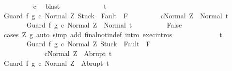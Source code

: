 \begin{isabellebody}
\ \ \ \ \ \ \ \ \isamarkupfalse%
\ c{\isacharprime}{\isacharprime}\ \isamarkupfalse%
\ blast\isanewline
\ \ \ \ \isamarkupfalse%
\isanewline
\ \ \ \ \ \ \isamarkupfalse%
\ t\isanewline
\ \ \ \ \ \ \isamarkupfalse%
\ {\isachardoublequoteopen}{\isasymGamma}{\isasymturnstile}{\isasymlangle}Guard\ f\ g\ c\ {\isacharcomma}Normal\ Z{\isasymrangle}\ {\isasymRightarrow}{\isasymnotin}{\isacharparenleft}{\isacharbraceleft}Stuck{\isacharbraceright}\ {\isasymunion}\ Fault\ {\isacharbackquote}\ {\isacharparenleft}{\isacharminus}F{\isacharparenright}{\isacharparenright}{\isachardoublequoteclose}\ \isanewline
\ \ \ \ \ \ \ \ {\isachardoublequoteopen}{\isasymGamma}{\isasymturnstile}{\isasymlangle}c{\isacharcomma}Normal\ Z{\isasymrangle}\ {\isasymRightarrow}\ Normal\ t{\isachardoublequoteclose}\isanewline
\ \ \ \ \ \ \isamarkupfalse%
\ {\isachardoublequoteopen}{\isasymGamma}{\isasymturnstile}{\isasymlangle}Guard\ f\ g\ c\ {\isacharcomma}Normal\ Z{\isasymrangle}\ {\isasymRightarrow}\ Normal\ t{\isachardoublequoteclose}\isanewline
\ \ \ \ \ \ \ \ \isamarkupfalse%
\ False\isanewline
\ \ \ \ \ \ \ \ \isamarkupfalse%
\ {\isacharparenleft}cases\ {\isachardoublequoteopen}Z{\isasymin}\ g{\isachardoublequoteclose}{\isacharparenright}\ {\isacharparenleft}auto\ simp\ add{\isacharcolon}\ final{\isacharunderscore}notin{\isacharunderscore}def\ intro{\isacharcolon}\ exec{\isachardot}intros\ {\isacharparenright}\isanewline
\ \ \ \ \isamarkupfalse%
\isanewline
\ \ \ \ \ \ \isamarkupfalse%
\ t\isanewline
\ \ \ \ \ \ \isamarkupfalse%
\ {\isachardoublequoteopen}{\isasymGamma}{\isasymturnstile}{\isasymlangle}Guard\ f\ g\ c\ {\isacharcomma}Normal\ Z{\isasymrangle}\ {\isasymRightarrow}{\isasymnotin}{\isacharparenleft}{\isacharbraceleft}Stuck{\isacharbraceright}\ {\isasymunion}\ Fault\ {\isacharbackquote}\ {\isacharparenleft}{\isacharminus}F{\isacharparenright}{\isacharparenright}{\isachardoublequoteclose}\ \isanewline
\ \ \ \ \ \ \ \ \ \ \ \ \ {\isachardoublequoteopen}{\isasymGamma}{\isasymturnstile}{\isasymlangle}c{\isacharcomma}Normal\ Z{\isasymrangle}\ {\isasymRightarrow}\ Abrupt\ t{\isachardoublequoteclose}\isanewline
\ \ \ \ \ \ \isamarkupfalse%
\ {\isachardoublequoteopen}{\isasymGamma}{\isasymturnstile}{\isasymlangle}Guard\ f\ g\ c\ {\isacharcomma}Normal\ Z{\isasymrangle}\ {\isasymRightarrow}\ Abrupt\ t{\isachardoublequoteclose}\isanewline
\ \ \ \ \ \ \ \ \isamarkupfalse%

\end{isabellebody}
